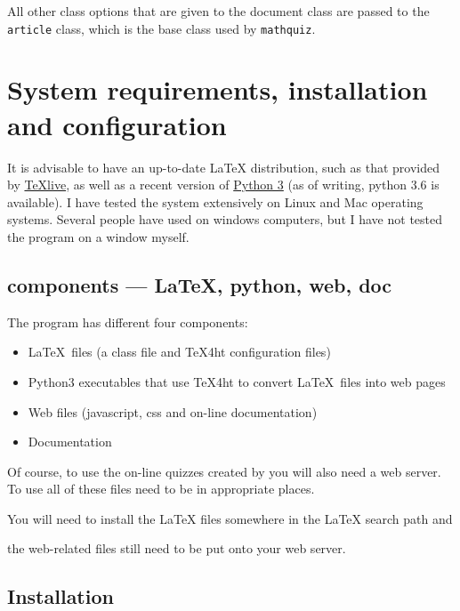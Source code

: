 \documentclass[svgnames]{article}
\newif\ifCtan\Ctanfalse %
\begin{document}
All other class options that are given to the \MathQuiz document class
are passed to the \texttt{article} class, which is the base class used
by \texttt{mathquiz}.

\section{System requirements, installation and configuration}\label{S:configuration}

    It is advisable to have an up-to-date \LaTeX{} distribution, such
    as that provided by \href{https://www.tug.org/texlive/}{\TeX live},
    as well as a recent version of \href{https://www.python.org/}{Python 3}
    (as of writing, python 3.6 is available). I have tested the
    \MathQuiz system extensively on Linux and Mac operating systems.
    Several people have used \MathQuiz on windows computers, but I
    have not tested the program on a window myself.

    \subsection{\MathQuiz components --- \LaTeX, python, web, doc}

    The \MathQuiz program has different four components:
      \begin{itemize}
           \item \LaTeX\ files (a class file and \TeX4ht configuration files)
           \item Python3 executables that use \TeX4ht to convert \LaTeX\ files into web pages
           \item Web files (javascript, css and on-line documentation)
           \item Documentation
      \end{itemize}
    Of course, to use the on-line quizzes created by \MathQuiz you will
    also need a web server. To use \MathQuiz all of these files need to
    be in appropriate places.
    \ifCtan Fortunately, \ctan[/]{ctan} takes care of most of this but
    \else
    You will need to install the \LaTeX{} files somewhere in the
    \LaTeX{} search path and
    \fi
    the web-related files still need to be put onto your web server.

    \subsection{Installation}
\end{document}
